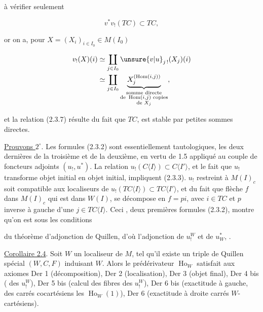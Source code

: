 
à vérifier seulement

\[
 v^{*}v_{!}(TC)\subset TC,\tag*{(2.3.7)}
\]

or on a, pour $X=(X_i)_{i\in I_0}\in M(I_0)$

\[
\begin{aligned}
 v_!(X)(i)&\simeq\coprod_{j\in I_0}\unsure{v|u}_{j\,!}(X_j)(i)\\
 &\simeq\coprod_{j\in I_0}\underbrace{X_j^{(\operatorname{Hom}(i,j))}}_{\substack{\text{somme directe}\\\text{de }\operatorname{Hom}(i,j)\text{ copies}\\\text{de }X_j}},
\end{aligned}
\]

et la relation (2.3.7) résulte du fait que
$TC$,  est stable par petites sommes directes.

\uline{Prouvons $2^\circ$}. Les formules (2.3.2) sont
essentiellement tautologiques, les deux dernières
 de la troisième et de la deuxième,
en vertu de 1.5 appliqué au couple de
foncteurs adjoints $(u_!,u^*)$. La relation
$u_!(C\langle I\rangle)\subset C\langle I'\rangle$, et le fait que
$u_!$ transforme objet initial en objet initial,
impliquent (2.3.3).  $u_!$ restreint à
$M(I)_c$ soit compatible aux localiseurs 
de $u_!(TC\langle I\rangle)\subset TC\langle I'\rangle$, et du
fait que  flèche $f$ dans $M(I)_c$ qui est
dans $W(I)$, se décompose en $f=pi$, avec
$i\in TC$ et $p$ inverse à gauche d'une $j\in TC\langle I\rangle$.
Ceci ,  deux premières formules
(2.3.2), montre qu'on est sous les conditions

du théorème d'adjonction de Quillen, d'où
l'adjonction de $u_!^W$ et de $u^*_{W}$, .

\uline{Corollaire 2.4}. Soit  $W$ un localiseur
de $M$, tel qu'il existe un  triple
de Quillen spécial $(W,C,F)$ induisant $W$.
Alors le prédérivateur  $\operatorname{Ho}_W$  satisfait
aux axiomes Der 1 (décomposition), Der 2
(localisation), Der 3 (objet final), Der 4 bis
( des $u_!^W$), Der 5 bis (calcul des
fibres des $u_!^W$), Der 6 bis (exactitude
à gauche,  des carrés cocartésiens  les $\operatorname{Ho}_W(1)$),
Der 6 (exactitude à droite  carrés $W$-cartésiens).

